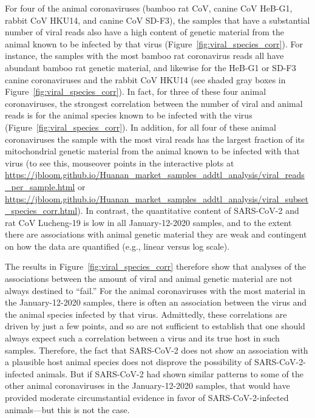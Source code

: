 \documentclass[9pt,onecolumn,twoside]{gsajnl_modified}
\begin{document}
For four of the animal coronaviruses (bamboo rat CoV, canine CoV HeB-G1, rabbit CoV HKU14, and canine CoV SD-F3), the samples that have a substantial number of viral reads also have a high content of genetic material from the animal known to be infected by that virus (Figure~\ref{fig:viral_species_corr}).
For instance, the samples with the most bamboo rat coronavirus reads all have abundant bamboo rat genetic material, and likewise for the HeB-G1 or SD-F3 canine coronaviruses and the rabbit CoV HKU14 (see shaded gray boxes in Figure~\ref{fig:viral_species_corr}).
In fact, for three of these four animal coronaviruses, the strongest correlation between the number of viral and animal reads is for the animal species known to be infected with the virus (Figure~\ref{fig:viral_species_corr}).
In addition, for all four of these animal coronaviruses the sample with the most viral reads has the largest fraction of its mitochondrial genetic material from the animal known to be infected with that virus (to see this, mouseover points in the interactive plots at \url{https://jbloom.github.io/Huanan_market_samples_addtl_analysis/viral_reads_per_sample.html} or \url{https://jbloom.github.io/Huanan_market_samples_addtl_analysis/viral_subset_species_corr.html}).
In contrast, the quantitative content of SARS-CoV-2 and rat CoV Lucheng-19 is low in all January-12-2020 samples, and to the extent there are associations with animal genetic material they are weak and contingent on how the data are quantified (e.g., linear versus log scale).

The results in Figure~\ref{fig:viral_species_corr} therefore show that analyses of the associations between the amount of viral and animal genetic material are not always destined to ``fail.''
For the animal coronaviruses with the most material in the January-12-2020 samples, there is often an association between the virus and the animal species infected by that virus.
Admittedly, these correlations are driven by just a few points, and so are not sufficient to establish that one should always expect such a correlation between a virus and its true host in such samples.
Therefore, the fact that SARS-CoV-2 does not show an association with a plausible host animal species does not disprove the possibility of SARS-CoV-2-infected animals.
But if SARS-CoV-2 had shown similar patterns to some of the other animal coronaviruses in the January-12-2020 samples, that would have provided moderate circumstantial evidence in favor of SARS-CoV-2-infected animals---but this is not the case.
\end{document}
